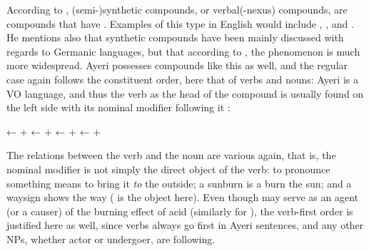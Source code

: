 According to \citet{bauer2001}, (semi-)synthetic compounds, or verbal(-nexus) 
compounds, are compounds that have . Examples of this type in English would include 
, , and . He mentions also 
that synthetic compounds have been mainly discussed with regards to Germanic 
languages, but that according to \citet[3608]{lieber1994}, the phenomenon is 
much more widespread. Ayeri possesses compounds like this as well, and the 
regular case again follows the constituent order, here that of verbs and nouns: 
Ayeri is a VO language, and thus the verb as the head of the compound is usually 
found on the left side with its nominal modifier following it 
\citep[129--133]{gaeta2008}:

\pex
	\a {}
		← 
		+ 
	\a {}
		← 
		+ 
	\a {}
		← 
		+ 
	\a {}
		← 
		+ 
\xe

The relations between the verb and the noun are various again, that is, the 
nominal modifier is not simply the direct object of the verb: to pronounce 
something means to bring it \emph{to} the outside; a sunburn is a burn 
 the sun; and a waysign shows the way ( is 
the object here). Even though  may serve as an agent (or a 
causer) of the burning effect of acid (similarly for 
), the verb-first order is justified here as 
well, since verbs always go first in Ayeri sentences, and any other NPs, 
whether actor or undergoer, are following.%

